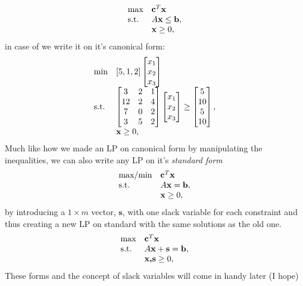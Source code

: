 \begin{align}\label{canonicalMax}
\begin{array}{ll@{}ll}
\text{max} &\textbf{c}^T\textbf{x}&\\
\text{s.t.} &A\textbf{x} \leq \textbf{b},&\\
&\textbf{x} \geq 0,&\\
\end{array}
\end{align}
in case of  we write it on it's canonical form:
\begin{align}
\begin{array}{ll@{}ll}
\text{min} &[5,1,2]\begin{bmatrix}x_{1} \\x_{2} \\x_{3}\end{bmatrix}&\\
\text{s.t.} &\begin{bmatrix}3&2&1 \\12&2&4 \\7&0&2\\3&5&2\end{bmatrix}\begin{bmatrix}x_{1} \\x_{2} \\x_{3}\end{bmatrix} \geq \begin{bmatrix}5 \\10 \\5\\10\end{bmatrix},&\\
&\textbf{x} \geq 0,&\\
\end{array}
\end{align}
Much like how we made an LP on canonical form by manipulating the inequalities, we can also write any LP on it's \textit{standard form} 
\begin{align}
\begin{array}{ll@{}ll}
\text{max/min} &\textbf{c}^T\textbf{x}&\\
\text{s.t.} &A\textbf{x} = \textbf{b},&\\
&\textbf{x} \geq 0,&\\
\end{array}
\end{align}
by introducing a $1\times m$ vector, $\textbf{s}$, with one slack variable for each constraint and thus creating a new LP on standard with the same solutions as the old one.
\begin{align}
\begin{array}{ll@{}ll}
\text{max} &\textbf{c}^T\textbf{x}&\\
\text{s.t.} &A\textbf{x}+\textbf{s} =\textbf{b},&\\
&\textbf{x,s} \geq 0,&\\
\end{array}
\end{align}
These forms and the concept of slack variables will come in handy later (I hope)
